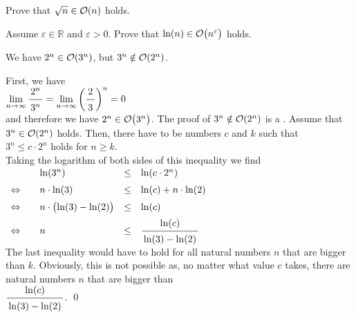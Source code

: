 \exercise
Prove that $\sqrt{n} \in \mathcal{O}(n)$ holds.  \eox

\exercise
Assume $\varepsilon \in \mathbb{R}$ and $\varepsilon > 0$.  Prove that $\ln(n) \in
\mathcal{O}\bigl(n^{\varepsilon}\bigr)$ holds. \eox

\example
We have $2^n \in \mathcal{O}(3^n)$, but  $3^n \notin \mathcal{O}(2^n)$.
\ex

\proof
 First, we have \\[0.2cm]
\hspace*{1.3cm} 
$\displaystyle\lim\limits_{n \rightarrow \infty} \bruch{2^n}{3^n} = 
 \lim\limits_{n \rightarrow \infty} \left(\bruch{2}{3}\right)^n = 0$
\\[0.2cm]
and therefore we have $2^n \in \mathcal{O}\bigl(3^n\bigr)$.  The proof of $3^n \notin \mathcal{O}(2^n)$ is a 
.  Assume that 
$3^n \in \mathcal{O}(2^n)$ holds.  Then, there have to be numbers $c$ and $k$ such that 
\\[0.2cm]
\hspace*{1.3cm}
$3^n \leq c \cdot 2^n$ \quad holds for $n \geq k$. 
\\[0.2cm]
Taking the logarithm of both sides of this inequality we find 
\\[0.2cm]
\hspace*{1.3cm}
$
\begin{array}{llcl}
                & \ln(3^n) & \leq & \ln(c \cdot 2^n) \\[0.2cm]
\Leftrightarrow\quad &  n \cdot \ln(3) & \leq & \ln(c) + n \cdot \ln(2) \\[0.2cm]
\Leftrightarrow &  n \cdot \bigl(\ln(3) - \ln(2)\bigr) & \leq & \ln(c)  \\[0.2cm]
\Leftrightarrow &  n  & \leq & \bruch{\ln(c)}{\ln(3) - \ln(2)}          \\[0.2cm]
\end{array}
$
\\[0.2cm]
The last inequality would have to hold for all natural numbers $n$ that are bigger than $k$.  Obviously,
this is not possible as, no matter what value $c$ takes, there are natural numbers $n$ that are bigger than 
\\[0.2cm]
\hspace*{1.3cm}
$\bruch{\ln(c)}{\ln(3) - \ln(2)}$.
\qed

